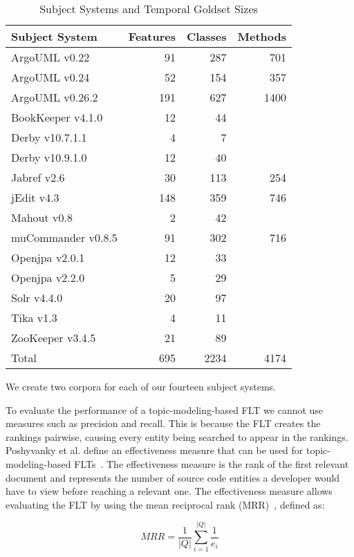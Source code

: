 \begin{table}[t]
\renewcommand{\arraystretch}{1.3}
\footnotesize
\centering
\caption{Subject Systems and Temporal Goldset Sizes}
\begin{tabular}{lrrr}
    \toprule
    Subject System      & Features  & Classes   & Methods \\
    \midrule
    ArgoUML v0.22 & 91 & 287 & 701 \\
    ArgoUML v0.24 & 52 & 154 & 357 \\
    ArgoUML v0.26.2 & 191 & 627 & 1400 \\
    BookKeeper v4.1.0 & 12 & 44 &   \\
    Derby v10.7.1.1 & 4 & 7 &   \\
    Derby v10.9.1.0 & 12 & 40 &   \\
    Jabref v2.6 & 30 & 113 & 254 \\
    jEdit v4.3 & 148 & 359 & 746 \\
    Mahout v0.8 & 2 & 42 &   \\
    muCommander v0.8.5 & 91 & 302 & 716 \\
    Openjpa v2.0.1 & 12 & 33 &   \\
    Openjpa v2.2.0 & 5 & 29 &   \\
    Solr v4.4.0 & 20 & 97 &   \\
    Tika v1.3 & 4 & 11 &   \\
    ZooKeeper v3.4.5 & 21 & 89 &   \\
    \midrule
Total & 695 & 2234 & 4174
\end{tabular}
\label{table:subjects:temporal}
\end{table}

We create two corpora for each of our fourteen subject systems.

To evaluate the performance of a topic-modeling-based FLT we cannot use
measures such as precision and recall. This is because the FLT creates
the rankings pairwise, causing every entity being searched to appear in the rankings.
Poshyvanky et al. define an effectiveness measure that can be used for topic-modeling-based FLTs~\cite{Poshyvanyk-etal:2007}.
The effectiveness measure is the rank of the first relevant document
and represents the number of source code entities a developer would have to view before reaching a relevant one.
The effectiveness measure allows evaluating the FLT by using
the mean reciprocal rank (MRR)~\cite{Voorhees:1999}, defined as:

\begin{equation}
    MRR = \frac{1}{|Q|} \sum_{i=1}^{|Q|} \frac{1}{e_i}
\end{equation}

